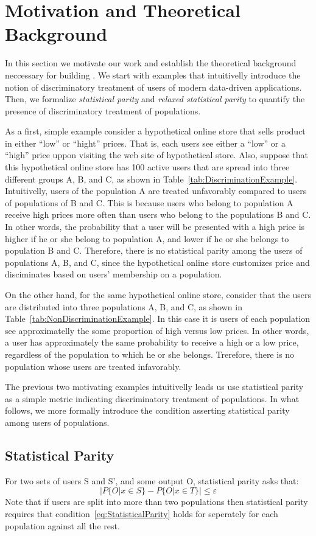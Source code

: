\section{Motivation and Theoretical Background}
In this section we motivate our work and establish the theoretical
background neccessary for building \sysname. We start with examples
that intuitivelly  introduce the notion of discriminatory treatment
of users of modern data-driven applications. Then, we formalize 
{\em statistical parity} and {\em relaxed statistical parity} to
quantify the presence of discriminatory treatment of populations.

As a first, simple example consider a hypothetical  online store that
sells product in either ``low'' or ``hight'' prices. That is, each
users see either a ``low'' or a ``high'' price uppon visiting the web
site of hypothetical store. Also, suppose that this hypothetical online
store has 100 active users that are spread into three different groups
A, B, and C, as shown in Table~\ref{tab:DiscriminationExample}.
Intuitivelly, users of
the population A are treated unfavorably compared to users of populations
of B and C. This is because users who belong to population A receive high
prices more often than users who belong to the populations B and C. In other
words, the probability that a user will be presented with a high price is
higher if he or she belong to population A, and lower if he or she belongs to
population B and C. Therefore, there is no statistical parity among the
users of populations A, B, and C, since the hypothetical online store
customizes price and disciminates based on users' membership on a population.

On the other hand, for the same hypothetical online store, consider
that the users are distributed into three populations A, B, and C, as
shown in Table~\ref{tab:NonDiscriminationExample}. In this case it is
users of each population see approximatelly the some proportion of high versus
low prices. In other words, a user has approximately the same probability to
receive a high or a low price, regardless of the population to which he or she
belongs. Trerefore, there is no population whose users are treated
infavorably.

The previous two motivating examples intuitivelly leads us use statistical
parity as a simple metric indicating discriminatory treatment of populations.
In what follows, we more formally introduce the condition asserting
statistical parity among users of populations.


\subsection{Statistical Parity}
For two sets of users S and S', and some output O, statistical parity
asks that:
\begin{equation}
|P\{O | x \in S\} - P\{O | x \in T\}| \le \varepsilon
\label{eq:StatisticalParity}
\end{equation}
Note that if users are split into more than two populations then statistical
parity requires that condition~\ref{eq:StatisticalParity} holds for seperately
for each population against all the rest.

